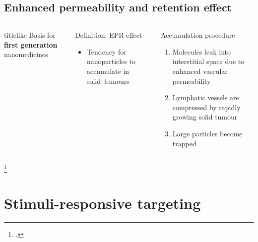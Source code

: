 \documentclass[aspectratio=169,compress]{beamer}
\newcommand*{\autotitle}{\subsecname\hfill\textbf{\small\secname}}
\begin{document}
\subsection{Enhanced permeability and retention effect}
\begin{frame}{\autotitle}
  \begin{columns}
      \begin{beamercolorbox}[rounded=true,shadow=true]{titlelike}\small
          Basis for \textbf{first generation} nanomedicines~
      \end{beamercolorbox}

      \begin{block}{Definition: EPR effect}
        \begin{itemize}
          \item Tendency for nanoparticles to accumulate in \alert{solid~tumours}~
        \end{itemize}
      \end{block}

      \begin{block}{Accumulation procedure}
        \begin{enumerate}
          \item Molecules leak into interstitial space due to \alert{enhanced vascular permeability}
          \item \alert{Lymphatic vessels} are compressed by rapidly growing solid tumour~
          \item Large particles become trapped
        \end{enumerate}
      \end{block}

  \end{columns}
  \footcitetext{maeda2000tumor,wicki2015nanomedicine,padera2004pathology}
\end{frame}

\section{Stimuli-responsive targeting}
\end{document}
